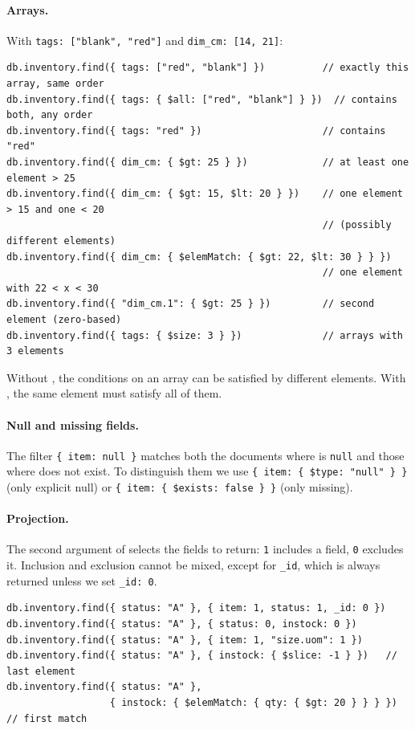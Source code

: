 \paragraph{Arrays.} With \texttt{tags: ["blank", "red"]} and \texttt{dim\_cm: [14, 21]}:
\begin{lstlisting}
db.inventory.find({ tags: ["red", "blank"] })          // exactly this array, same order
db.inventory.find({ tags: { $all: ["red", "blank"] } })  // contains both, any order
db.inventory.find({ tags: "red" })                     // contains "red"
db.inventory.find({ dim_cm: { $gt: 25 } })             // at least one element > 25
db.inventory.find({ dim_cm: { $gt: 15, $lt: 20 } })    // one element > 15 and one < 20
                                                       // (possibly different elements)
db.inventory.find({ dim_cm: { $elemMatch: { $gt: 22, $lt: 30 } } })
                                                       // one element with 22 < x < 30
db.inventory.find({ "dim_cm.1": { $gt: 25 } })         // second element (zero-based)
db.inventory.find({ tags: { $size: 3 } })              // arrays with 3 elements
\end{lstlisting}
\begin{remark}
Without , the conditions on an array can be satisfied by different elements. With , the same element must satisfy all of them.
\end{remark}

\paragraph{Null and missing fields.} The filter \texttt{\{ item: null \}} matches both the documents where  is \texttt{null} and those where  does not exist. To distinguish them we use \texttt{\{ item: \{ \$type: "null" \} \}} (only explicit null) or \texttt{\{ item: \{ \$exists: false \} \}} (only missing).

\paragraph{Projection.} The second argument of  selects the fields to return: \texttt{1} includes a field, \texttt{0} excludes it. Inclusion and exclusion cannot be mixed, except for \texttt{\_id}, which is always returned unless we set \texttt{\_id: 0}.
\begin{lstlisting}
db.inventory.find({ status: "A" }, { item: 1, status: 1, _id: 0 })
db.inventory.find({ status: "A" }, { status: 0, instock: 0 })
db.inventory.find({ status: "A" }, { item: 1, "size.uom": 1 })
db.inventory.find({ status: "A" }, { instock: { $slice: -1 } })   // last element
db.inventory.find({ status: "A" },
                  { instock: { $elemMatch: { qty: { $gt: 20 } } } })  // first match
\end{lstlisting}

